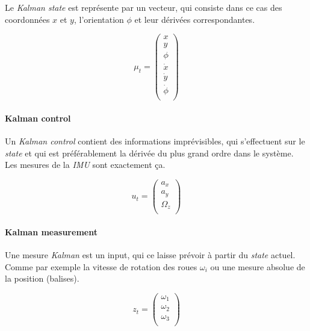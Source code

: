 \documentclass[a4paper]{paper}
\begin{document}
Le \emph{Kalman state} est représente par un vecteur, qui consiste dans ce cas des
coordonnées $x$ et $y$, l'orientation $\phi$ et leur dérivées correspondantes.

\begin{equation}
    \mu_t =
    \left( \begin{array}{c}
        x \\
        y \\
        \phi \\
        \dot{x} \\
        \dot{y} \\
        \dot{\phi} \\
    \end{array} \right)
    \label{State}
\end{equation}

\paragraph{Kalman control}

Un \emph{Kalman control} contient des informations imprévisibles, qui s'effectuent
sur le \emph{state} et qui est préférablement la dérivée du plus grand ordre dans
le système.
Les mesures de la \emph{IMU} sont exactement ça.

\begin{equation}
    u_t =
    \left( \begin{array}{c}
        a_x \\
        a_y \\
        \Omega_z \\
    \end{array} \right)
    \label{Control}
\end{equation}

\paragraph{Kalman measurement}

Une mesure \emph{Kalman} est un input, qui ce laisse prévoir à partir du \emph{state}
actuel.
Comme par exemple la vitesse de rotation des roues $ \omega_i $ ou une
mesure absolue de la position (balises).

\begin{equation}
    z_t =
    \left( \begin{array}{c}
        \omega_1 \\
        \omega_2 \\
        \omega_3 \\
    \end{array} \right)
    \label{Measurement}
\end{equation}
\end{document}
